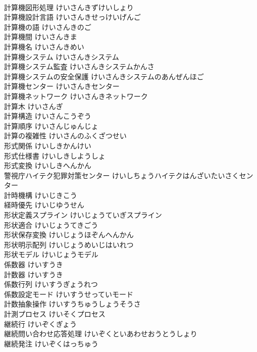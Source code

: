 \documentclass[8pt]{extreport}
\begin{document}
\begin{CJK}{UTF8}{min}
\\	計算機図形処理	けいさんきずけいしょり	
\\	計算機設計言語	けいさんきせっけいげんご	
\\	計算機の語	けいさんきのご	
\\	計算機間	けいさんきま	
\\	計算機名	けいさんきめい	
\\	計算機システム	けいさんきシステム	
\\	計算機システム監査	けいさんきシステムかんさ	
\\	計算機システムの安全保護	けいさんきシステムのあんぜんほご	
\\	計算機センター	けいさんきセンター	
\\	計算機ネットワーク	けいさんきネットワーク	
\\	計算木	けいさんぎ	
\\	計算構造	けいさんこうぞう	
\\	計算順序	けいさんじゅんじょ	
\\	計算の複雑性	けいさんのふくざつせい	
\\	形式関係	けいしきかんけい	
\\	形式仕様書	けいしきしようしょ	
\\	形式変換	けいしきへんかん	
\\	警視庁ハイテク犯罪対策センター	けいしちょうハイテクはんざいたいさくセンター	
\\	計時機構	けいじきこう	
\\	経時優先	けいじゆうせん	
\\	形状定義スプライン	けいじょうていぎスプライン	
\\	形状適合	けいじょうてきごう	
\\	形状保存変換	けいじょうほぞんへんかん	
\\	形状明示配列	けいじょうめいじはいれつ	
\\	形状モデル	けいじょうモデル	
\\	係数器	けいすうき	
\\	計数器	けいすうき	
\\	係数行列	けいすうぎょうれつ	
\\	係数設定モード	けいすうせっていモード	
\\	計数抽象操作	けいすうちゅうしょうそうさ	
\\	計測プロセス	けいそくプロセス	
\\	継続行	けいぞくぎょう	
\\	継続問い合わせ応答処理	けいぞくといあわせおうとうしょり	
\\	継続発注	けいぞくはっちゅう	

\end{CJK}
\end{document}
